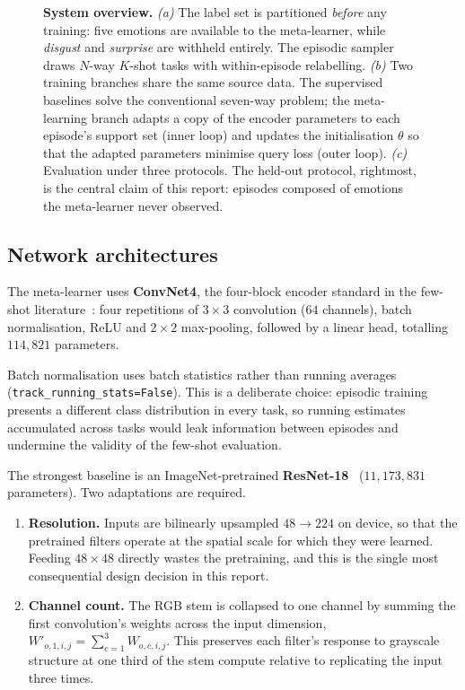 \documentclass[11pt,a4paper]{article}
\begin{document}
\begin{figure}[!tp]
{%
}
\caption{\textbf{System overview.} \emph{(a)} The label set is partitioned
\emph{before} any training: five emotions are available to the meta-learner,
while \emph{disgust} and \emph{surprise} are withheld entirely. The episodic
sampler draws $N$-way $K$-shot tasks with within-episode relabelling.
\emph{(b)} Two training branches share the same source data. The supervised
baselines solve the conventional seven-way problem; the meta-learning branch
adapts a copy of the encoder parameters to each episode's support set (inner
loop) and updates the initialisation $\theta$ so that the adapted parameters
minimise query loss (outer loop). \emph{(c)} Evaluation under three protocols.
The held-out protocol, rightmost, is the central claim of this report:
episodes composed of emotions the meta-learner never observed.}
\label{fig:pipeline}
\end{figure}

\subsection{Network architectures}
The meta-learner uses \textbf{ConvNet4}, the four-block encoder standard in the
few-shot literature~\cite{vinyals2016matching,finn2017model}: four repetitions
of $3\times3$ convolution ($64$ channels), batch normalisation, ReLU and
$2\times2$ max-pooling, followed by a linear head, totalling $114{,}821$
parameters.

Batch normalisation uses batch statistics rather than running averages
(\texttt{track\_\-running\_\-stats=False}). This is a deliberate choice: episodic
training presents a different class distribution in every task, so running
estimates accumulated across tasks would leak information between episodes and
undermine the validity of the few-shot evaluation.

The strongest baseline is an ImageNet-pretrained
\textbf{ResNet-18}~\cite{he2016deep} ($11{,}173{,}831$ parameters). Two
adaptations are required.

\begin{enumerate}\itemsep3pt
\item \textbf{Resolution.} Inputs are bilinearly upsampled $48 \to 224$ on
device, so that the pretrained filters operate at the spatial scale for which
they were learned. Feeding $48\times48$ directly wastes the pretraining, and
this is the single most consequential design decision in this report.

\item \textbf{Channel count.} The RGB stem is collapsed to one channel by
summing the first convolution's weights across the input dimension,
$W'_{o,1,i,j} = \sum_{c=1}^{3} W_{o,c,i,j}$. This preserves each filter's
response to grayscale structure at one third of the stem compute relative to
replicating the input three times.
\end{enumerate}
\end{document}
